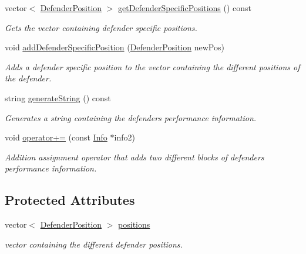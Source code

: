 \begin{DoxyCompactItemize}
vector$<$ \hyperlink{_utils_8hpp_a94ee089ecd5db12c81c7edbefaabff4d}{Defender\+Position} $>$ \hyperlink{class_info_d_f_a8e30128320b378b09477070781f9fe98}{get\+Defender\+Specific\+Positions} () const
\begin{DoxyCompactList}\small\item\em Gets the vector containing defender specific positions. \end{DoxyCompactList}\item 
void \hyperlink{class_info_d_f_aaa161b2c4a56878d3c691ec4de3129c3}{add\+Defender\+Specific\+Position} (\hyperlink{_utils_8hpp_a94ee089ecd5db12c81c7edbefaabff4d}{Defender\+Position} new\+Pos)
\begin{DoxyCompactList}\small\item\em Adds a defender specific position to the vector containing the different positions of the defender. \end{DoxyCompactList}\item 
string \hyperlink{class_info_d_f_a036c0f0898331e092f913da788b7ccdb}{generate\+String} () const
\begin{DoxyCompactList}\small\item\em Generates a string containing the defender\textquotesingle{}s performance information. \end{DoxyCompactList}\item 
void \hyperlink{class_info_d_f_a7dc54a1e9dbb5028eb1f9972d1e42951}{operator+=} (const \hyperlink{class_info}{Info} $\ast$info2)
\begin{DoxyCompactList}\small\item\em Addition assignment operator that adds two different blocks of defender\textquotesingle{}s performance information. \end{DoxyCompactList}\end{DoxyCompactItemize}
\subsection*{Protected Attributes}
\begin{DoxyCompactItemize}
\item 
vector$<$ \hyperlink{_utils_8hpp_a94ee089ecd5db12c81c7edbefaabff4d}{Defender\+Position} $>$ \hyperlink{class_info_d_f_ae694b60f6efc0190b16a99748b0eca40}{positions}
\begin{DoxyCompactList}\small\item\em vector containing the different defender positions. \end{DoxyCompactList}\end{DoxyCompactItemize}


